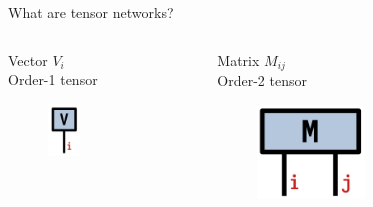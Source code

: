\begin{frame}[fragile]{What are tensor networks?}

\begin{columns}

  \begin{column}[T]{0.33\textwidth}
    \centering
    Vector $V_i$ \\
    Order-1 tensor
    \begin{figure}[T]
      \includegraphics[width=0.3\textwidth]{
        slides/assets/V.png
      }
    \end{figure}
  \end{column}

  \begin{column}[T]{0.33\textwidth}
    \centering
    Matrix $M_{ij}$ \\
    Order-2 tensor
    \begin{figure}[T]
      \includegraphics[width=0.5\textwidth]{
        slides/assets/M.png
      }
    \end{figure}
  \end{column}


\end{columns}
\end{frame}
